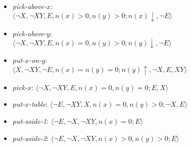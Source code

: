 \documentclass[letterpaper]{article} %
\newcommand{\tuple}[1]{\ensuremath{\langle #1 \rangle}}
\begin{document}
\begin{itemize}
\item \emph{pick-above-$x$}: \\\hspace*{\fill}  \tuple{\neg X, \neg XY, E, n(x) > 0, n(y)>0; n(x) \downarrow, \neg E  }

\item \emph{pick-above-$y$}: \\\hspace*{\fill}  \tuple{\neg X, \neg XY, E, n(x) = 0, n(y)>0; n(y) \downarrow, \neg E  }

\item \emph{put-$x$-on-$y$}: \\\hspace*{\fill} \tuple{X, \neg XY, \neg E, n(x)=n(y)=0 ; n(y) \uparrow, \neg X, E, XY}

\item \emph{pick-$x$}:         \hspace*{\fill}  \tuple{\neg X, \neg XY, E, n(x)=0, n(y)=0; E, X}

\item \emph{put-$x$-table}:                     \tuple{\neg E, \neg XY, X, n(x)=0, n(y) > 0; \neg X, E}

\item \emph{put-aside-1}:      \hspace*{\fill} \tuple{\neg E, \neg X, \neg XY, n(x) = 0; E}

\item \emph{put-aside-2}:      \hspace*{\fill} \tuple{\neg E, \neg X, \neg XY, n(x) > 0, n(y) > 0; E}
\end{itemize}

% 
% 
% 
% 
% 
% 
\end{document}
